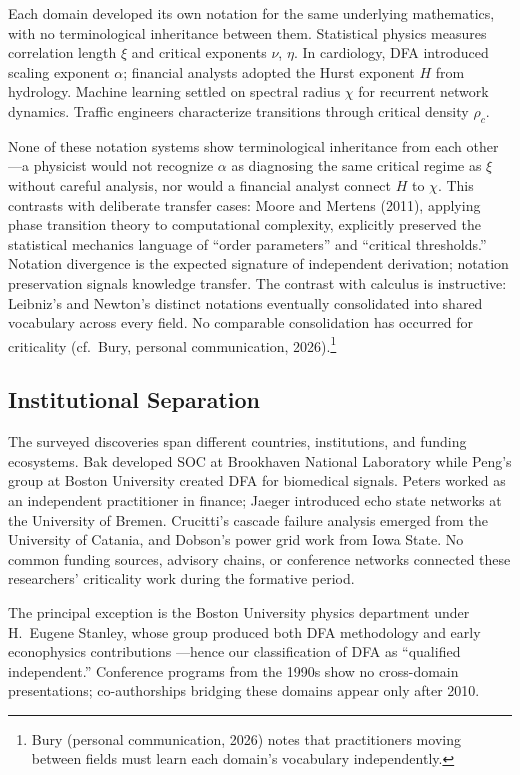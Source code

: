 \documentclass[11pt]{article}
\begin{document}
Each domain developed its own notation for the same underlying mathematics, with no terminological inheritance between them. Statistical physics measures correlation length $\xi$ and critical exponents $\nu$, $\eta$. In cardiology, DFA introduced scaling exponent $\alpha$; financial analysts adopted the Hurst exponent $H$ from hydrology. Machine learning settled on spectral radius $\chi$ for recurrent network dynamics. Traffic engineers characterize transitions through critical density $\rho_c$.

None of these notation systems show terminological inheritance from each other---a physicist would not recognize $\alpha$ as diagnosing the same critical regime as $\xi$ without careful analysis, nor would a financial analyst connect $H$ to $\chi$. This contrasts with deliberate transfer cases: Moore and Mertens (2011), applying phase transition theory to computational complexity, explicitly preserved the statistical mechanics language of ``order parameters'' and ``critical thresholds.'' Notation divergence is the expected signature of independent derivation; notation preservation signals knowledge transfer. The contrast with calculus is instructive: Leibniz's and Newton's distinct notations eventually consolidated into shared vocabulary across every field. No comparable consolidation has occurred for criticality (cf.\ Bury, personal communication, 2026).\footnote{Bury (personal communication, 2026) notes that practitioners moving between fields must learn each domain's vocabulary independently.}

\subsection{Institutional Separation}

The surveyed discoveries span different countries, institutions, and funding ecosystems. Bak developed SOC at Brookhaven National Laboratory while Peng's group at Boston University created DFA for biomedical signals. Peters worked as an independent practitioner in finance; Jaeger introduced echo state networks at the University of Bremen. Crucitti's cascade failure analysis emerged from the University of Catania, and Dobson's power grid work from Iowa State. No common funding sources, advisory chains, or conference networks connected these researchers' criticality work during the formative period.

The principal exception is the Boston University physics department under H.\ Eugene Stanley, whose group produced both DFA methodology \citep{peng1994dna} and early econophysics contributions \citep{mantegna1995}---hence our classification of DFA as ``qualified independent.'' Conference programs from the 1990s show no cross-domain presentations; co-authorships bridging these domains appear only after 2010.
\end{document}
